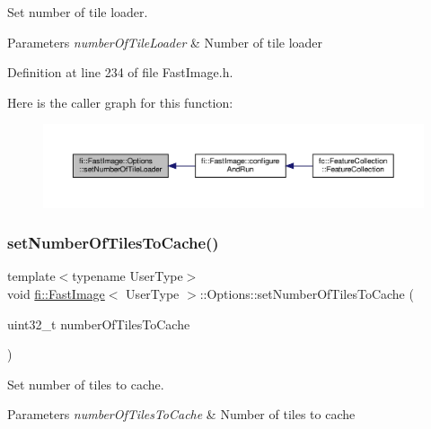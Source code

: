 Set number of tile loader. 


\begin{DoxyParams}{Parameters}
{\em number\+Of\+Tile\+Loader} & Number of tile loader \\
\hline
\end{DoxyParams}


Definition at line 234 of file Fast\+Image.\+h.

Here is the caller graph for this function\+:
\nopagebreak
\begin{figure}[H]
\begin{center}
\leavevmode
\includegraphics[width=350pt]{dc/db9/classfi_1_1FastImage_1_1Options_a9b060d7dbba17c77f4c5716bb9306827_icgraph}
\end{center}
\end{figure}
\mbox{\label{classfi_1_1FastImage_1_1Options_ad208b65af20fb02a91a49b8e6f345cef}} 
\subsubsection{\texorpdfstring{set\+Number\+Of\+Tiles\+To\+Cache()}{setNumberOfTilesToCache()}}
{\footnotesize\ttfamily template$<$typename User\+Type$>$ \\
void \hyperlink{classfi_1_1FastImage}{fi\+::\+Fast\+Image}$<$ User\+Type $>$\+::Options\+::set\+Number\+Of\+Tiles\+To\+Cache (\begin{DoxyParamCaption}\item[{uint32\+\_\+t}]{number\+Of\+Tiles\+To\+Cache }\end{DoxyParamCaption})\hspace{0.3cm}{\ttfamily [inline]}}



Set number of tiles to cache. 


\begin{DoxyParams}{Parameters}
{\em number\+Of\+Tiles\+To\+Cache} & Number of tiles to cache \\
\hline
\end{DoxyParams}


